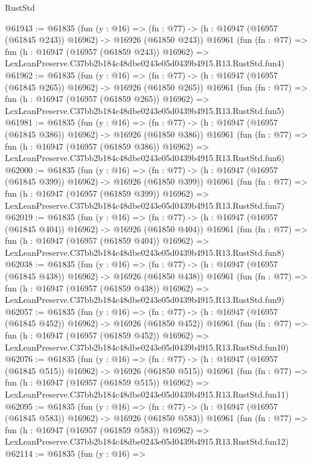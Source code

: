 \begin{lexlean}{RustStd}
\begin{coremodule}
@61943 := @61835
    (fun (y : @16) =>
    (fn : @77) -> (h : @16947 (@16957 (@61845 @243)) @16962) -> @16926 (@61850 @243))
    @16961
    (fun (fn : @77) =>
    fun (h : @16947 (@16957 (@61859 @243)) @16962) =>
    LexLeanPreserve.C37bb2b184c48dbe0243e05d0439b4915.R13.RustStd.fun4)
@61962 := @61835
    (fun (y : @16) =>
    (fn : @77) -> (h : @16947 (@16957 (@61845 @265)) @16962) -> @16926 (@61850 @265))
    @16961
    (fun (fn : @77) =>
    fun (h : @16947 (@16957 (@61859 @265)) @16962) =>
    LexLeanPreserve.C37bb2b184c48dbe0243e05d0439b4915.R13.RustStd.fun5)
@61981 := @61835
    (fun (y : @16) =>
    (fn : @77) -> (h : @16947 (@16957 (@61845 @386)) @16962) -> @16926 (@61850 @386))
    @16961
    (fun (fn : @77) =>
    fun (h : @16947 (@16957 (@61859 @386)) @16962) =>
    LexLeanPreserve.C37bb2b184c48dbe0243e05d0439b4915.R13.RustStd.fun6)
@62000 := @61835
    (fun (y : @16) =>
    (fn : @77) -> (h : @16947 (@16957 (@61845 @399)) @16962) -> @16926 (@61850 @399))
    @16961
    (fun (fn : @77) =>
    fun (h : @16947 (@16957 (@61859 @399)) @16962) =>
    LexLeanPreserve.C37bb2b184c48dbe0243e05d0439b4915.R13.RustStd.fun7)
@62019 := @61835
    (fun (y : @16) =>
    (fn : @77) -> (h : @16947 (@16957 (@61845 @404)) @16962) -> @16926 (@61850 @404))
    @16961
    (fun (fn : @77) =>
    fun (h : @16947 (@16957 (@61859 @404)) @16962) =>
    LexLeanPreserve.C37bb2b184c48dbe0243e05d0439b4915.R13.RustStd.fun8)
@62038 := @61835
    (fun (y : @16) =>
    (fn : @77) -> (h : @16947 (@16957 (@61845 @438)) @16962) -> @16926 (@61850 @438))
    @16961
    (fun (fn : @77) =>
    fun (h : @16947 (@16957 (@61859 @438)) @16962) =>
    LexLeanPreserve.C37bb2b184c48dbe0243e05d0439b4915.R13.RustStd.fun9)
@62057 := @61835
    (fun (y : @16) =>
    (fn : @77) -> (h : @16947 (@16957 (@61845 @452)) @16962) -> @16926 (@61850 @452))
    @16961
    (fun (fn : @77) =>
    fun (h : @16947 (@16957 (@61859 @452)) @16962) =>
    LexLeanPreserve.C37bb2b184c48dbe0243e05d0439b4915.R13.RustStd.fun10)
@62076 := @61835
    (fun (y : @16) =>
    (fn : @77) -> (h : @16947 (@16957 (@61845 @515)) @16962) -> @16926 (@61850 @515))
    @16961
    (fun (fn : @77) =>
    fun (h : @16947 (@16957 (@61859 @515)) @16962) =>
    LexLeanPreserve.C37bb2b184c48dbe0243e05d0439b4915.R13.RustStd.fun11)
@62095 := @61835
    (fun (y : @16) =>
    (fn : @77) -> (h : @16947 (@16957 (@61845 @583)) @16962) -> @16926 (@61850 @583))
    @16961
    (fun (fn : @77) =>
    fun (h : @16947 (@16957 (@61859 @583)) @16962) =>
    LexLeanPreserve.C37bb2b184c48dbe0243e05d0439b4915.R13.RustStd.fun12)
@62114 := @61835
    (fun (y : @16) =>

\end{coremodule}
\end{lexlean}
